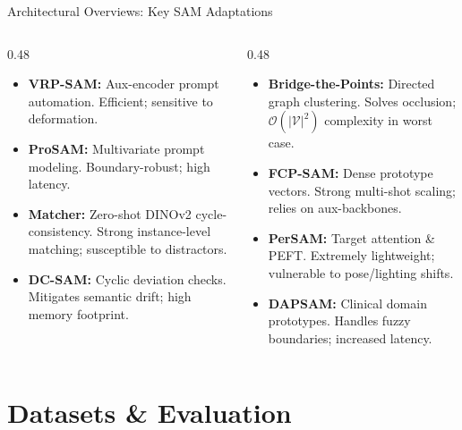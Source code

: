 \documentclass[aspectratio=169, 10pt]{beamer}
\begin{document}
\begin{frame}{Architectural Overviews: Key SAM Adaptations}
    \footnotesize
    \begin{columns}[T]
        \begin{column}{0.48\textwidth}
            \begin{itemize}
                \item \textbf{VRP-SAM:} Aux-encoder prompt automation. Efficient; sensitive to deformation.
                \item \textbf{ProSAM:} Multivariate prompt modeling. Boundary-robust; high latency.
                \item \textbf{Matcher:} Zero-shot DINOv2 cycle-consistency. Strong instance-level matching; susceptible to distractors.
                \item \textbf{DC-SAM:} Cyclic deviation checks. Mitigates semantic drift; high memory footprint.
            \end{itemize}
        \end{column}
        
        \begin{column}{0.48\textwidth}
            \begin{itemize}
                \item \textbf{Bridge-the-Points:} Directed graph clustering. Solves occlusion; $\mathcal{O}(|\mathcal{V}|^2)$ complexity in worst case.
                \item \textbf{FCP-SAM:} Dense prototype vectors. Strong multi-shot scaling; relies on aux-backbones.
                \item \textbf{PerSAM:} Target attention \& PEFT. Extremely lightweight; vulnerable to pose/lighting shifts.
                \item \textbf{DAPSAM:} Clinical domain prototypes. Handles fuzzy boundaries; increased latency.
            \end{itemize}
        \end{column}
    \end{columns}
\end{frame}
\section{Datasets \& Evaluation}
\end{document}
